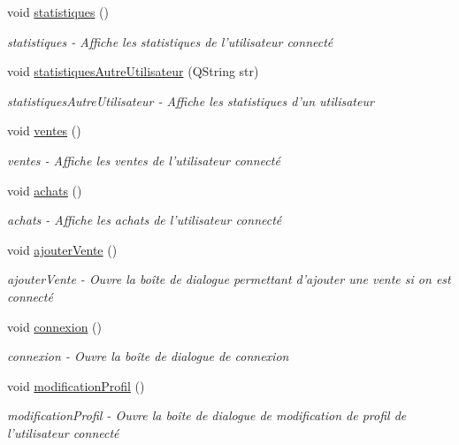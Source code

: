 \begin{DoxyCompactItemize}
void \hyperlink{class_ma_fenetre_abdebcc3a608ba960f92d9c33198afa8e}{statistiques} ()
\begin{DoxyCompactList}\small\item\em statistiques -\/ Affiche les statistiques de l'utilisateur connecté \end{DoxyCompactList}\item 
void \hyperlink{class_ma_fenetre_a001780a069e034521e7669382d7eb5e1}{statistiques\-Autre\-Utilisateur} (Q\-String str)
\begin{DoxyCompactList}\small\item\em statistiques\-Autre\-Utilisateur -\/ Affiche les statistiques d'un utilisateur \end{DoxyCompactList}\item 
void \hyperlink{class_ma_fenetre_ae0699859505bac920f9cb033ddb1da23}{ventes} ()
\begin{DoxyCompactList}\small\item\em ventes -\/ Affiche les ventes de l'utilisateur connecté \end{DoxyCompactList}\item 
void \hyperlink{class_ma_fenetre_a48f619e7d913b0e969273be7435b9ab5}{achats} ()
\begin{DoxyCompactList}\small\item\em achats -\/ Affiche les achats de l'utilisateur connecté \end{DoxyCompactList}\item 
void \hyperlink{class_ma_fenetre_abd8cb1d6b536873f3d369457073270c4}{ajouter\-Vente} ()
\begin{DoxyCompactList}\small\item\em ajouter\-Vente -\/ Ouvre la boîte de dialogue permettant d'ajouter une vente si on est connecté \end{DoxyCompactList}\item 
void \hyperlink{class_ma_fenetre_a65270bfc0eeecb1003c6abc9a1199f32}{connexion} ()
\begin{DoxyCompactList}\small\item\em connexion -\/ Ouvre la boîte de dialogue de connexion \end{DoxyCompactList}\item 
void \hyperlink{class_ma_fenetre_a4568c5e0376f04b9d1ab6c54b9f7c7ed}{modification\-Profil} ()
\begin{DoxyCompactList}\small\item\em modification\-Profil -\/ Ouvre la boîte de dialogue de modification de profil de l'utilisateur connecté \end{DoxyCompactList}\item 

\end{DoxyCompactItemize}
